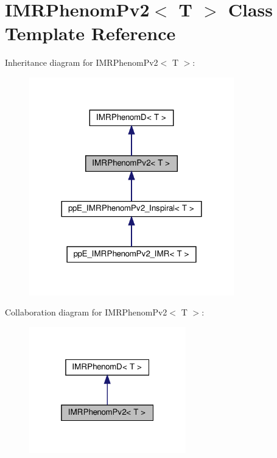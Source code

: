\hypertarget{classIMRPhenomPv2}{}\section{I\+M\+R\+Phenom\+Pv2$<$ T $>$ Class Template Reference}
\label{classIMRPhenomPv2}


Inheritance diagram for I\+M\+R\+Phenom\+Pv2$<$ T $>$\+:\nopagebreak
\begin{figure}[H]
\begin{center}
\leavevmode
\includegraphics[width=252pt]{classIMRPhenomPv2__inherit__graph}
\end{center}
\end{figure}


Collaboration diagram for I\+M\+R\+Phenom\+Pv2$<$ T $>$\+:\nopagebreak
\begin{figure}[H]
\begin{center}
\leavevmode
\includegraphics[width=193pt]{classIMRPhenomPv2__coll__graph}
\end{center}
\end{figure}
